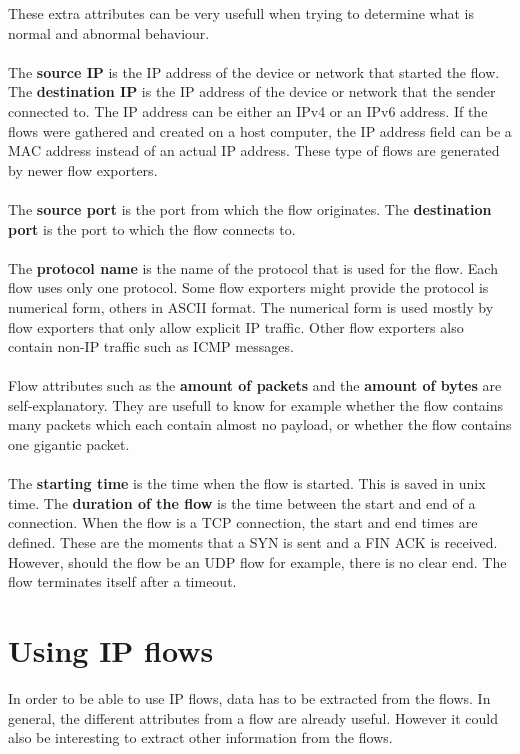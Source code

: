 \noindent These extra attributes can be very usefull when trying to determine what is normal and abnormal behaviour. \\
\\
\noindent The \textbf{source IP} is the IP address of the device or network that started the flow. The \textbf{destination IP} is the IP address of the device or network that the sender connected to. The IP address can be either an IPv4 or an IPv6 address. If the flows were gathered and created on a host computer, the IP address field can be a MAC address instead of an actual IP address. These type of flows are generated by newer flow exporters.\\
\\
The \textbf{source port} is the port from which the flow originates. The \textbf{destination port} is the port to which the flow connects to. \\
\\
The \textbf{protocol name} is the name of the protocol that is used for the flow. Each flow uses only one protocol. Some flow exporters might provide the protocol is numerical form, others in ASCII format. The numerical form is used mostly by flow exporters that only allow explicit IP traffic. Other flow exporters also contain non-IP traffic such as ICMP messages. \\
\\
Flow attributes such as the \textbf{amount of packets} and the \textbf{amount of bytes} are self-explanatory. They are usefull to know for example whether the flow contains many packets which each contain almost no payload, or whether the flow contains one gigantic packet. \\
\\
The \textbf{starting time} is the time when the flow is started. This is saved in unix time. The \textbf{duration of the flow} is the time between the start and end of a connection. When the flow is a TCP connection, the start and end times are defined. These are the moments that a SYN is sent and a FIN ACK is received. However, should the flow be an UDP flow for example, there is no clear end. The flow terminates itself after a timeout. 

\section{Using IP flows}
In order to be able to use IP flows, data has to be extracted from the flows. In general, the different attributes from a flow are already useful. However it could also be interesting to extract other information from the flows. 

